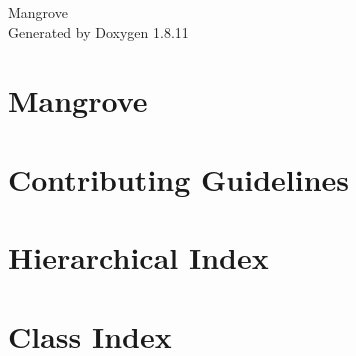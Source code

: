 \documentclass[twoside]{book}
\newcommand{\+}{\discretionary{\mbox{\scriptsize$\hookleftarrow$}}{}{}}
\newcommand{\clearemptydoublepage}{%
  \newpage{\pagestyle{empty}\cleardoublepage}%
}
\begin{document}
\hypersetup{pageanchor=false,
             bookmarksnumbered=true,
             pdfencoding=unicode
            }
\begin{titlepage}
\vspace*{7cm}
\begin{center}%
{\Large Mangrove }\\
\vspace*{1cm}
{\large Generated by Doxygen 1.8.11}\\
\end{center}
\end{titlepage}
\clearemptydoublepage
\tableofcontents
\clearemptydoublepage
{}
\hypersetup{pageanchor=true}

\chapter{Mangrove}
\label{index}\hypertarget{index}{}
\chapter{Contributing Guidelines}
\label{md_CONTRIBUTING}
\hypertarget{md_CONTRIBUTING}{}

\chapter{Hierarchical Index}

\chapter{Class Index}

\end{document}
